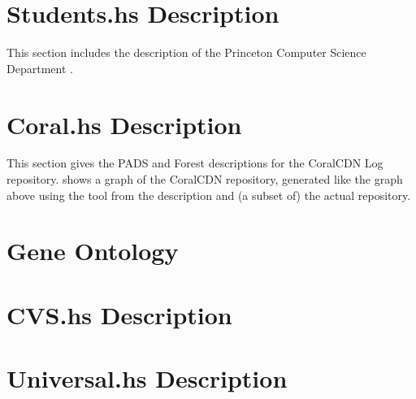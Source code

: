 \documentclass[nocopyrightspace,natbib,onecolumn,9pt]{sigplanconf}
\begin{document}
\section{Students.hs Description}
This section includes the \forest{} description of the Princeton
Computer Science Department \filestore{}.


\newpage
\vfill
\section{Coral.hs Description}

This section gives the PADS and Forest descriptions for the CoralCDN
Log repository.  shows a graph of the CoralCDN
repository, generated like the graph above using the 
tool from the description and (a subset of) the actual repository.



\newpage

\section{Gene Ontology}


\section{CVS.hs Description}


\section{Universal.hs Description}

\end{document}
